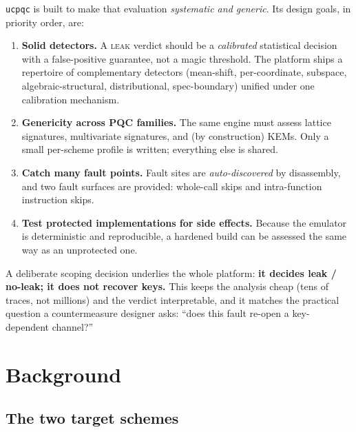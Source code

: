 \documentclass[11pt]{article}
\newcommand{\code}[1]{\texttt{#1}}
\newcommand{\ucpqc}{\code{ucpqc}}
\begin{document}
\ucpqc{} is built to make that evaluation \emph{systematic and generic}. Its
design goals, in priority order, are:

\begin{enumerate}[leftmargin=1.6em]
  \item \textbf{Solid detectors.} A \textsc{leak} verdict should be a
  \emph{calibrated} statistical decision with a false-positive guarantee, not a
  magic threshold. The platform ships a repertoire of complementary detectors
  (mean-shift, per-coordinate, subspace, algebraic-structural, distributional,
  spec-boundary) unified under one calibration mechanism.
  \item \textbf{Genericity across PQC families.} The same engine must assess
  lattice signatures, multivariate signatures, and (by construction) KEMs. Only a
  small per-scheme profile is written; everything else is shared.
  \item \textbf{Catch many fault points.} Fault sites are \emph{auto-discovered}
  by disassembly, and two fault surfaces are provided: whole-call skips and
  intra-function instruction skips.
  \item \textbf{Test protected implementations for side effects.} Because the
  emulator is deterministic and reproducible, a hardened build can be assessed the
  same way as an unprotected one.
\end{enumerate}

A deliberate scoping decision underlies the whole platform: \textbf{it decides
leak / no-leak; it does not recover keys.} This keeps the analysis cheap
(tens of traces, not millions) and the verdict interpretable, and it matches the
practical question a countermeasure designer asks: ``does this fault re-open a
key-dependent channel?''

\section{Background}

\subsection{The two target schemes}
\end{document}
